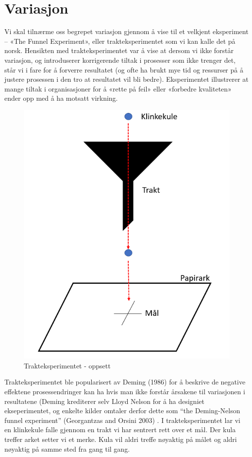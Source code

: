 \documentclass[
]{book}
\begin{document}
\hypertarget{variasjon}{%
\chapter{Variasjon}\label{variasjon}}

Vi skal tilnærme oss begrepet variasjon gjennom å vise til et velkjent eksperiment -- «The Funnel Experiment», eller trakteksperimentet som vi kan kalle det på norsk. Hensikten med trakteksperimentet var å vise at dersom vi ikke forstår variasjon, og introduserer korrigerende tiltak i prosesser som ikke trenger det, står vi i fare for å forverre resultatet (og ofte ha brukt mye tid og ressurser på å justere prosessen i den tro at resultatet vil bli bedre). Eksperimentet illustrerer at mange tiltak i organisasjoner for å «rette på feil» eller «forbedre kvaliteten» ender opp med å ha motsatt virkning.

\begin{figure}
\centering
\includegraphics{trakteksp.png}
\caption{Trakteksperimentet - oppsett}
\end{figure}

Trakteksperimentet ble popularisert av Deming (1986) for å beskrive de negative effektene prosessendringer kan ha hvis man ikke forstår årsakene til variasjonen i resultatene (Deming krediterer selv Lloyd Nelson for å ha designiet ekseperimentet, og enkelte kilder omtaler derfor dette som ``the Deming-Nelson funnel experiment'' (Georgantzas and Orsini 2003) . I trakteksperimentet lar vi en klinkekule falle gjennom en trakt vi har sentrert rett over et mål. Der kula treffer arket setter vi et merke. Kula vil aldri treffe nøyaktig på målet og aldri nøyaktig på samme sted fra gang til gang.
\end{document}

